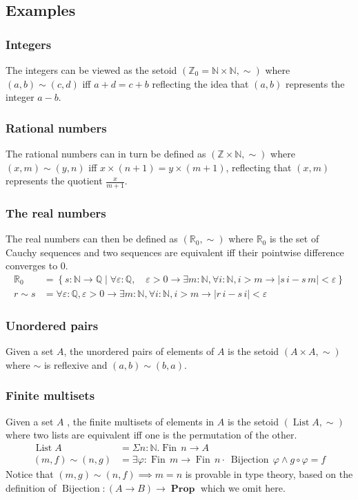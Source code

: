 \documentclass[envcountsame]{llncs}
\newcommand{\N}{\mathbb{N}}
\newcommand{\Q}{\mathbb{Q}}
\newcommand{\R}{\mathbb{R}}
\newcommand{\Z}{\mathbb{Z}}
\providecommand{\set}  [1]{\left\{#1\right\}}
\DeclareMathOperator{\Prop}{\mathbf{Prop}}
\DeclareMathOperator{\List}{List}
\DeclareMathOperator{\Fin}{Fin}
\DeclareMathOperator{\Bijection}{Bijection}
\begin{document}
\subsection{Examples}\label{sec:setoids:examples}
\subsubsection*{Integers}\label{sec:setoids:examples:integers}
The integers can be viewed as the setoid $(\Z_0=\N\times\N,\sim)$ where $(a,b)\sim(c,d)$ if{f} $a+d=c+b$ reflecting the idea that $(a,b)$ represents the integer $a-b$.
\subsubsection*{Rational numbers}
The rational numbers can in turn be defined as $(\Z\times\N,\sim)$ where $(x,m)\sim(y,n)$ if{f} $x\times(n+1)=y\times(m+1)$, reflecting that $(x,m)$ represents the quotient $\frac {x}{m+1}$.


\subsubsection*{The real numbers}

The real numbers can then be defined as $(\R_0,\sim)$ where $\R_0$ is the set of Cauchy sequences and two sequences are equivalent if{f} their pointwise difference converges to $0$.
\begin{align*}
\R_0&=\set{s : \N\to\Q \mid \forall\varepsilon :\Q,\quad\varepsilon>0\to\exists m:\N, \forall i:\N, i>m\to |s\,i - s\, m|<\varepsilon}\\
r\sim s &= \forall\varepsilon :\Q,\varepsilon>0\to\exists m:\N, \forall i:\N, i>m\to |r\,i - s\,i|<\varepsilon
\end{align*}

\subsubsection*{Unordered pairs}
Given a set $A$, the unordered pairs of elements of $A$ is the setoid $(A\times A,\sim)$ where
$\sim$ is reflexive and $(a,b)\sim(b,a)$.

\subsubsection*{Finite multisets}
Given a set $A$ , the finite multisets of elements in $A$ is the setoid $(\List A,\sim)$ where two lists are equivalent if{f} one is the permutation of the other.
\begin{align*}
\List A &= \Sigma n:\N.\Fin\,n\to A\\
(m,f)\sim(n,g) &= \exists \varphi : \Fin\,m \to \Fin\,n \cdot\ \Bijection\,\varphi \land g\circ\varphi = f
\end{align*}
Notice that $(m,g)\sim(n,f)\implies m=n$ is provable in type theory, based on the definition of $\Bijection : (A\to B)\to \Prop$ which we omit here.
\end{document}
